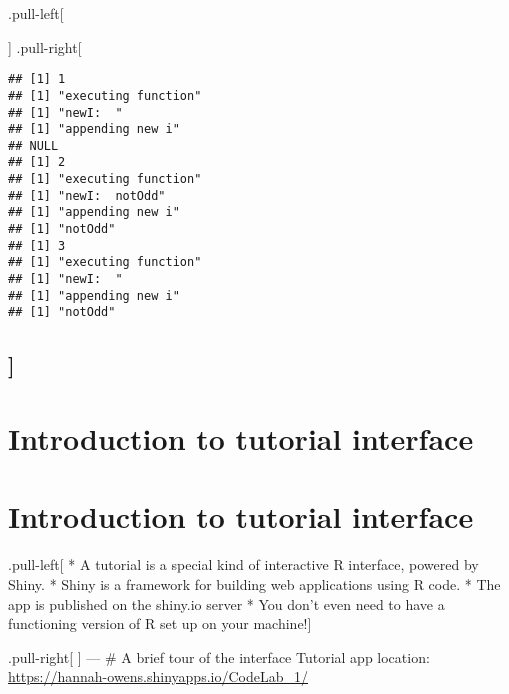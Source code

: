 \documentclass[
]{article}
\newenvironment{Shaded}{\begin{snugshade}}{\end{snugshade}}
\newcommand{\ControlFlowTok}[1]{\textcolor[rgb]{0.13,0.29,0.53}{\textbf{#1}}}
\newcommand{\DecValTok}[1]{\textcolor[rgb]{0.00,0.00,0.81}{#1}}
\newcommand{\ErrorTok}[1]{\textcolor[rgb]{0.64,0.00,0.00}{\textbf{#1}}}
\newcommand{\KeywordTok}[1]{\textcolor[rgb]{0.13,0.29,0.53}{\textbf{#1}}}
\newcommand{\NormalTok}[1]{#1}
\newcommand{\OperatorTok}[1]{\textcolor[rgb]{0.81,0.36,0.00}{\textbf{#1}}}
\newcommand{\StringTok}[1]{\textcolor[rgb]{0.31,0.60,0.02}{#1}}
\begin{document}
.pull-left{[}

\begin{Shaded}
\end{Shaded}

{]} .pull-right{[}

\begin{verbatim}
## [1] 1
## [1] "executing function"
## [1] "newI:  "
## [1] "appending new i"
## NULL
## [1] 2
## [1] "executing function"
## [1] "newI:  notOdd"
## [1] "appending new i"
## [1] "notOdd"
## [1] 3
## [1] "executing function"
## [1] "newI:  "
## [1] "appending new i"
## [1] "notOdd"
\end{verbatim}

\hypertarget{section}{%
\subsection{{]}}\label{section}}

\hypertarget{introduction-to-tutorial-interface}{%
\section{Introduction to tutorial
interface}\label{introduction-to-tutorial-interface}}

\hypertarget{introduction-to-tutorial-interface-1}{%
\section{Introduction to tutorial
interface}\label{introduction-to-tutorial-interface-1}}

.pull-left{[} * A tutorial is a special kind of interactive R interface,
powered by Shiny. * Shiny is a framework for building web applications
using R code. * The app is published on the shiny.io server * You don't
even need to have a functioning version of R set up on your machine!{]}

.pull-right{[} {]} --- \# A brief tour of the interface Tutorial app
location: \url{https://hannah-owens.shinyapps.io/CodeLab_1/}
\end{document}
